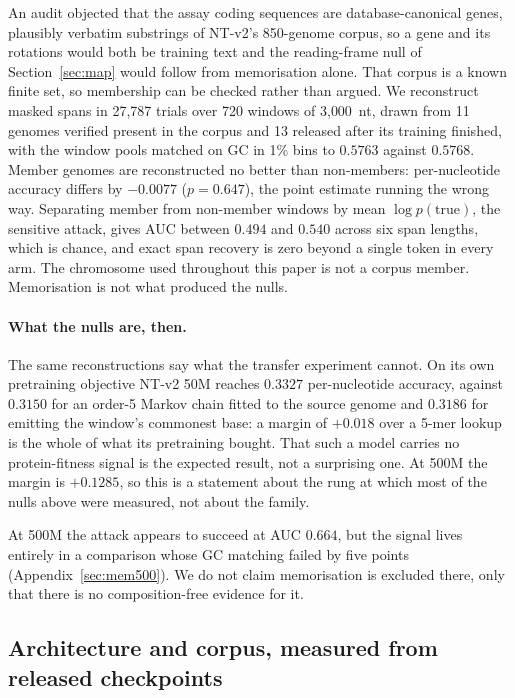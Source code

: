 \documentclass[11pt]{article}
\begin{document}
An audit objected that the assay coding sequences are database-canonical genes,
plausibly verbatim substrings of NT-v2's 850-genome corpus, so a gene and its
rotations would both be training text and the reading-frame null of
Section~\ref{sec:map} would follow from memorisation alone. That corpus is a known
finite set, so membership can be checked rather than argued. We reconstruct masked spans in 27{,}787 trials over 720 windows of 3{,}000~nt,
drawn from 11 genomes verified present in the corpus and 13 released after its
training finished, with the window pools matched on GC in 1\% bins to $0.5763$
against $0.5768$. Member genomes are reconstructed no better than non-members:
per-nucleotide accuracy differs by $-0.0077$ ($p=0.647$), the point estimate
running the wrong way. Separating member from non-member windows by mean
$\log p(\text{true})$, the sensitive attack, gives AUC between $0.494$ and $0.540$
across six span lengths, which is chance, and exact span recovery is zero beyond a
single token in every arm. The chromosome used throughout this paper is not a
corpus member. Memorisation is not what produced the nulls.

\paragraph{What the nulls are, then.} The same reconstructions say what the
transfer experiment cannot. On its own pretraining objective NT-v2 50M reaches
$0.3327$ per-nucleotide accuracy, against $0.3150$ for an order-5 Markov chain
fitted to the source genome and $0.3186$ for emitting the window's commonest base:
a margin of $+0.018$ over a 5-mer lookup is the whole of what its pretraining
bought. That such a model carries no protein-fitness signal is the expected result,
not a surprising one. At 500M the margin is $+0.1285$, so this is a statement about
the rung at which most of the nulls above were measured, not about the family.

At 500M the attack appears to succeed at AUC $0.664$, but the signal lives
entirely in a comparison whose GC matching failed by five points
(Appendix~\ref{sec:mem500}). We do not claim memorisation is excluded there, only
that there is no composition-free evidence for it.

\subsection{Architecture and corpus, measured from released checkpoints}
\label{sec:stage0}
\end{document}
